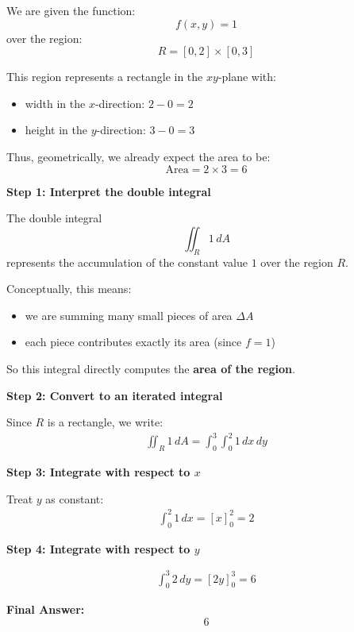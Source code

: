 \begin{examplebox}
    We are given the function:
    \begin{equation*}
        f(x,y) = 1
    \end{equation*}
    over the region:
    \begin{equation*}
        R = [0,2] \times [0,3]
    \end{equation*}

    This region represents a rectangle in the $xy$-plane with:
    \begin{itemize}
        \item width in the $x$-direction: $2 - 0 = 2$
        \item height in the $y$-direction: $3 - 0 = 3$
    \end{itemize}

    Thus, geometrically, we already expect the area to be:
    \[
        \text{Area} = 2 \times 3 = 6
    \]

    \textbf{Step 1: Interpret the double integral}

    The double integral
    \begin{equation*}
        \iint_R 1\, dA
    \end{equation*}
    represents the accumulation of the constant value $1$ over the region $R$.

    Conceptually, this means:
    \begin{itemize}
        \item we are summing many small pieces of area $\Delta A$
        \item each piece contributes exactly its area (since $f=1$)
    \end{itemize}

    So this integral directly computes the \textbf{area of the region}.

    \textbf{Step 2: Convert to an iterated integral}

    Since $R$ is a rectangle, we write:
    \begin{align*}
        \iint_R 1\, dA = \int_0^3 \int_0^2 1\, dx\, dy
    \end{align*}

    \textbf{Step 3: Integrate with respect to $x$}

    Treat $y$ as constant:
    \begin{align*}
        \int_0^2 1\, dx = [x]_0^2 = 2
    \end{align*}

    \textbf{Step 4: Integrate with respect to $y$}

    \begin{align*}
        \int_0^3 2\, dy = [2y]_0^3 = 6
    \end{align*}

    \textbf{Final Answer:}
    \begin{equation*}
        \boxed{6}
    \end{equation*}
\end{examplebox}